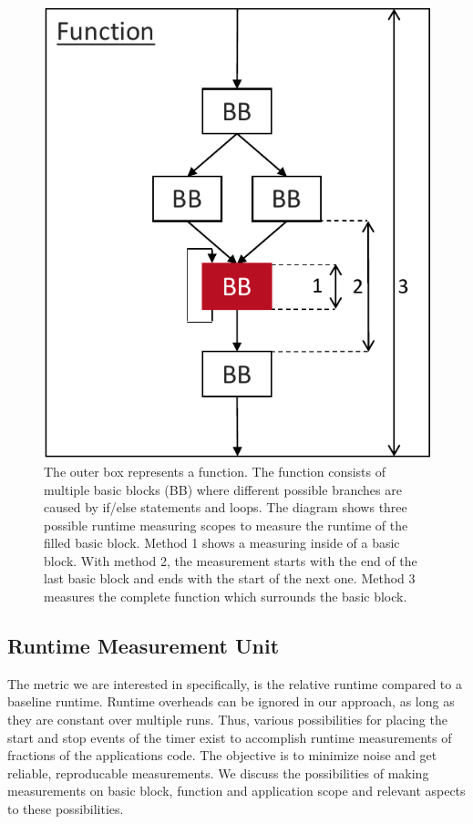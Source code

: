 \begin{figure}
    \centering
    \includegraphics[scale=0.8]{img/ppt/runtime_measurement_scopes-crop.pdf}
    \caption[Possibile scopes for measuring runtimes]{The outer box represents a function. 
    The function consists of multiple basic blocks (BB) where different possible branches are caused by if/else statements and loops. 
    The diagram shows three possible runtime measuring scopes to measure the runtime of the filled basic block.
    Method 1 shows a measuring inside of a basic block. 
    With method 2, the measurement starts with the end of the last basic block and ends with the start of the next one.
    Method 3 measures the complete function which surrounds the basic block.}
    \label{fig:approach:runtime_scopes}
\end{figure}

\subsection{Runtime Measurement Unit}
\tobechecked
The metric we are interested in specifically, is the relative runtime compared to a baseline runtime.
Runtime overheads can be ignored in our approach, as long as they are constant over multiple runs.
Thus, various possibilities for placing the start and stop events of the timer exist to accomplish runtime measurements of fractions of the applications code.
The objective is to minimize noise and get reliable, reproducable measurements.
We discuss the possibilities of making measurements on basic block, function and application scope and relevant aspects to these possibilities.

